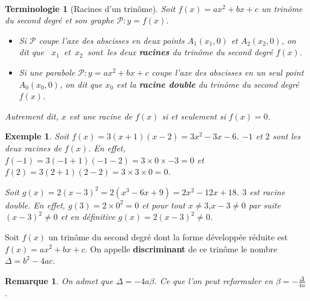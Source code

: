 \documentclass[a4paper,11pt]{article}
\title{}
\author{}
\date{}
\theoremstyle{break}
\newtheorem{Term}{Terminologie}
\newtheorem{Rq}{Remarque}
\newtheorem{Ex}{Exemple}
\newcounter{numero}
\newcommand{\exo}{
  \addtocounter{numero}{1}%
  \textbf{\underline{Exercice \arabic{numero}:}}\quad}
\begin{document}
  \setlength{\unitlength}{1mm}
  \setlength\parindent{0mm}
  
  
  ~
  \medskip
  
  \begin{Term}[Racines d'un trinôme]
    Soit $f(x)=ax^2+bx+c$ un trinôme du second degré et son graphe $\mathcal{P}:y=f(x)$.
    \begin{itemize}
     \item 
    Si $\mathcal{P}$ coupe l'axe des abscisses en deux points 
    $A_1(x_1,0)$ et $A_2(x_2,0)$,
    on dit que \mbox{ $x_1$ et $x_2$ sont les} deux \textbf{racines} 
    du trinôme du second degré $f(x)$.
    
    \item
    Si une parabole $\mathcal{P}:y=ax^2+bx+c$ coupe l'axe des abscisses en un seul 
    point $A_0(x_0,0)$, on dit que $x_0$ est la \textbf{racine double} du trinôme du second 
    degré $f(x)$.
    
    
    \end{itemize}

    
    Autrement dit, $x$ est une racine de $f(x)$ si et seulement si $f(x)=0$.
  \end{Term}
  
  \begin{Ex}
    Soit $f(x)=3(x+1)(x-2)=3x^2-3x-6$. $-1$ et $2$ sont les deux racines de $f(x)$.\newline
    En effet, $f(-1)=3(-1+1)(-1-2)=3\times0 \times -3=0$ et $f(2)=3(2+1)(2-2)=3 \times 3 \times 0=0$.
    
    Soit $g(x)=2(x-3)^2=2(x^3-6x+9)=2x^2-12x+18$. $3$ est racine double. 
    En effet, $g(3)=2\times 0^2=0$ et pour tout $x \neq 3$,$x-3\neq0$ par suite 
    $(x-3)^2 \neq 0$ et en définitive $g(x)=2(x-3)^2 \neq 0$. 
  \end{Ex}
  
  \begin{Def}[Discriminant]
    Soit $f(x)$ un trinôme du second degré dont la forme développée réduite
    est $f(x)=ax^2+bx+c$. On appelle \textbf{discriminant} de ce trinôme
    le nombre $\Delta=b^2-4ac$.
  \end{Def}
  
  \begin{Rq}
    On admet que $\Delta=-4a\beta$. Ce que l'on peut reformuler en 
    $\beta=-\frac{\Delta}{4a}$.
  \end{Rq}

  
  
  
\end{document}
